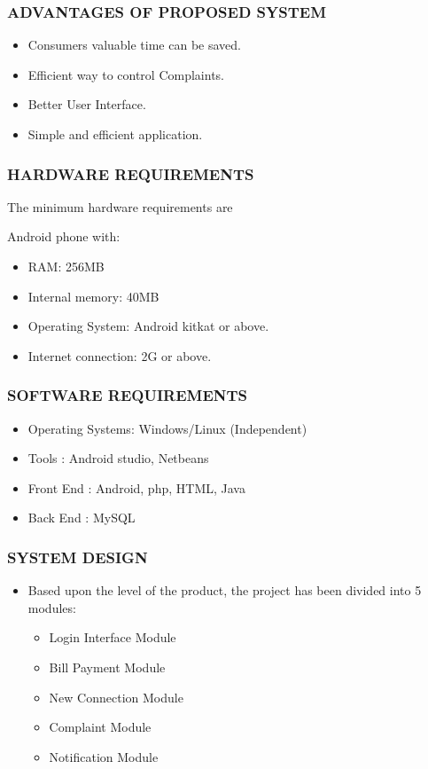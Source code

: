 \documentclass{beamer} %
\theoremstyle{definition} %
\begin{document}
\begin{frame}
\frametitle{ADVANTAGES OF PROPOSED SYSTEM}
\begin{itemize}
		\item  Consumers valuable time can be saved.
		\item Efficient way to control Complaints.
		\item Better User Interface.
		\item Simple and efficient application.
\end{itemize}
\end{frame}
\begin{frame}
\frametitle {HARDWARE REQUIREMENTS}
 The minimum hardware requirements are
 \par 
 Android phone with:
\begin{itemize}

	\item  RAM: 256MB
	\item Internal memory: 40MB
	\item Operating System: Android kitkat or above.
	\item Internet connection: 2G or above.
	
	
	
\end{itemize}
\end{frame}
\begin{frame}
\frametitle {SOFTWARE REQUIREMENTS }
\begin{itemize}
	\item Operating Systems: Windows/Linux (Independent)
	\item Tools : Android studio, Netbeans
	\item Front End : Android, php, HTML, Java
	\item Back End : MySQL

	
	
\end{itemize}
\end{frame}

\begin{frame}
\frametitle{SYSTEM DESIGN }
\begin{itemize}
\item Based upon the level of the product, the project has been divided into 5 modules:
\begin{itemize}
	\item Login Interface Module
	\item Bill Payment Module
	\item New Connection Module
	\item Complaint Module
	\item Notification Module
\end{itemize}
\end{itemize}
\end{frame}
\end{document}
